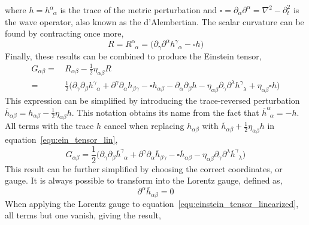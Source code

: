 where $h = h^{\alpha}_{\;\;\alpha}$ is the trace of the metric perturbation and $\square = \partial_{\alpha}\partial^{\alpha} = \nabla^{2} - \partial^{2}_{t}$ is the wave operator, also known as the d'Alembertian. The scalar curvature can be found by contracting once more,
\begin{equation}
    R = R^{\alpha}_{\;\;\alpha} = \big(\partial_{\gamma}\partial^{\alpha}h^{\gamma}_{\;\;\alpha} - \square h\big)
\end{equation}
Finally, these results can be combined to produce the Einstein tensor,
\begin{equation}
\label{equ:ein_tensor_lin}
    \begin{split}
    G_{\alpha\beta} =& \,R_{\alpha\beta} - \frac{1}{2}\eta_{\alpha\beta}R \\
    =& \,\frac{1}{2}\big(\partial_{\gamma}\partial_{\beta}h^{\gamma}_{\;\;\alpha} + \partial^{\gamma}\partial_{\alpha}h_{\beta\gamma} - \square h_{\alpha\beta} - \partial_{\alpha}\partial_{\beta}h - \eta_{\alpha\beta}\partial_{\gamma}\partial^{\lambda}h^{\gamma}_{\;\;\lambda} + \eta_{\alpha\beta}\square h\big)
    \end{split}
\end{equation}
This expression can be simplified by introducing the trace-reversed perturbation $\overline{h}_{\alpha\beta} = h_{\alpha\beta} - \frac{1}{2}\eta_{\alpha\beta}h$. This notation obtains its name from the fact that $\overline{h}^{\alpha}_{\;\;\alpha} = -h$. All terms with the trace $h$ cancel when replacing $h_{\alpha\beta}$ with $\overline{h}_{\alpha\beta} + \frac{1}{2}\eta_{\alpha\beta}h$ in equation~\ref{equ:ein_tensor_lin},
\begin{equation}
\label{equ:einstein_tensor_linearized}
    G_{\alpha\beta} = \frac{1}{2}\big(\partial_{\gamma}\partial_{\beta}\overline{h}^{\gamma}_{\;\;\alpha} + \partial^{\gamma}\partial_{\alpha}\overline{h}_{\beta\gamma} - \square \overline{h}_{\alpha\beta} - \eta_{\alpha\beta}\partial_{\gamma}\partial^{\lambda}\overline{h}^{\gamma}_{\;\;\lambda}\big)
\end{equation}
This result can be further simplified by choosing the correct coordinates, or gauge. It is always possible to transform into the Lorentz gauge, defined as,
\begin{equation}
\label{equ:lorentz_gauge}
    \partial^{\alpha}\overline{h}_{\alpha\beta} = 0
\end{equation}
When applying the Lorentz gauge to equation~\ref{equ:einstein_tensor_linearized}, all terms but one vanish, giving the result,
